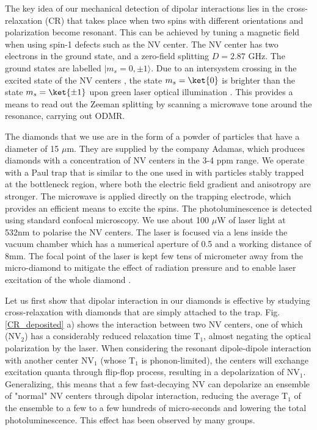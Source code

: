 \documentclass[preprintnumbers,amsmath,amssymb,superscriptaddress,twocolumn,showpacs]{revtex4-1}
\begin{document}
The key idea of our mechanical detection of dipolar interactions lies in the cross-relaxation (CR) that takes place when two spins with different orientations and polarization become resonant. This can be achieved by tuning a magnetic field when using spin-1 defects such as the NV center.
The NV center has two electrons in the ground state, and a zero-field splitting $D=2.87$ GHz.
The ground states are labelled $| m_s={0}, {\pm 1}\rangle$.
Due to an intersystem crossing in the excited state of the NV centers \cite{Doherty}, the state $m_s=\ket{0}$ is brighter than the state $m_s=\ket{\pm 1}$ upon green laser optical illumination \cite{Hopper}. This provides a means to read out the Zeeman splitting by scanning a microwave tone around the resonance, carrying out ODMR.

The diamonds that we use are in the form of a powder of particles that have a diameter of 15 $\mu$m. They are supplied by the company Adamas, which produces diamonds with a concentration of NV centers in the 3-4 ppm range. 
We operate with a Paul trap that is similar to the one used in \cite{delordPRL} with particles stably trapped at the bottleneck region, where both the electric field gradient and anisotropy are stronger.
The microwave is applied directly on the trapping electrode, which provides an efficient means to excite the spins.
The photoluminescence is detected using standard confocal microscopy. We use about 100 $\mu$W of laser light at 532nm to polarise the NV centers. The laser is focused via a lens inside the vacuum chamber which has a numerical aperture of 0.5 and a working distance of 8mm. The focal point of the laser is kept few tens of micrometer away from the micro-diamond to mitigate the effect of radiation pressure and to enable laser excitation of the whole diamond \cite{delordPRL,delord2016}. 

Let us first show that dipolar interaction in our diamonds is effective by studying cross-relaxation with diamonds that are simply attached to the trap.
Fig. \ref{CR_deposited} a) shows the interaction between two NV centers, one of which (NV$_2$) has a considerably reduced relaxation time T$_1$, almost negating the optical polarization by the laser. When considering the resonant dipole-dipole interaction with another center NV$_1$ (whose T$_1$ is phonon-limited), the centers will exchange excitation quanta through flip-flop process, resulting in a depolarization of NV$_1$. Generalizing, this means that a few fast-decaying NV can depolarize an ensemble of "normal" NV centers through dipolar interaction, reducing the average T$_1$ of the ensemble to a few to a few hundreds of micro-seconds \cite{Jarmola} and lowering the total photoluminescence. 
This effect has been observed by many groups\cite{van_oort_cross-relaxation_1989, armstrong_nvnv_2010, jarmola_longitudinal_2015, akhmedzhanov_microwave-free_2017, akhmedzhanov_magnetometry_2019, holliday_optical_1989, mrozek_longitudinal_2015, jarmola_temperature-_2012, choi_depolarization_2017}.
\end{document}
